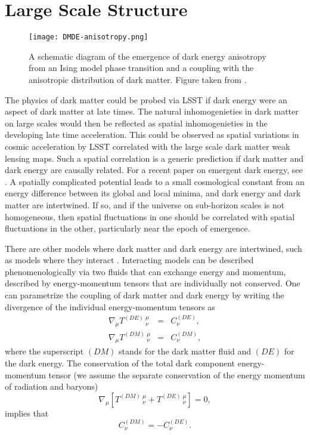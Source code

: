 \section{Large Scale Structure }
\label{sec:lss}

\begin{figure}[t]
\centering
\texttt{[image: DMDE-anisotropy.png]}
\caption{A schematic diagram of the emergence of dark energy anisotropy from an Ising model phase transition and a coupling with the anisotropic distribution of dark matter. Figure taken from \cite{1810.11007}.}
\label{fig:DMDEmap}
\end{figure}

The physics of dark matter could be probed via LSST if dark energy were an aspect of dark matter at late times. 
The natural inhomogenieties in dark matter on large scales would then be reflected as spatial inhomogenieties in the developing late time acceleration. 
This could be observed as spatial variations in cosmic acceleration by LSST correlated with the large scale dark matter weak lensing maps. 
Such a spatial correlation is a generic prediction if dark matter and dark energy are causally related. 
For a recent paper on emergent dark energy, see \cite{1801.09658}. 
A spatially complicated potential leads to a small cosmological constant from an energy difference between its global and local minima, and dark energy and dark matter are intertwined. 
If so, and if the universe on sub-horizon scales is not homogeneous, then spatial fluctuations in one should be correlated with spatial fluctuations in the other, particularly near the epoch of emergence.

There are other models where dark matter and dark energy are intertwined, such as models where they interact 
\citep{Amendola:1999er,Holden:1999hm}.
Interacting models can be described phenomenologically via two fluids that can exchange energy and momentum, 
described by energy-momentum tensors that are individually not conserved. One can parametrize the coupling of
dark matter and dark energy by writing the divergence of the individual energy-momentum tensors as 
\begin{eqnarray}
\nabla_{\mu} T^{(DE)}\,^{\mu}_{\nu} &=& C^{(DE)}_{\nu}, \label{cons_phi} \\
\nabla_{\mu} T^{(DM)}\,^{\mu}_{\nu} &=& C^{(DM)}_{\nu}, \label{cons_dm}
\end{eqnarray}
where the superscript $(DM)$ stands for the dark matter fluid and $(DE)$ for the dark energy.
The conservation of the total dark component energy-momentum tensor 
(we assume the separate conservation of the energy momentum of radiation and baryons)
\begin{equation}
\label{energyconservation}
\nabla_{\mu} \left[ T^{(DM)} \,^{\mu}_{\nu} + T^{(DE)} \,^{\mu}_{\nu} \right]= 0,
\end{equation}
implies that
\begin{equation}
C^{(DM)}_{\nu}=-C^{(DE)}_{\nu}.
\end{equation}

